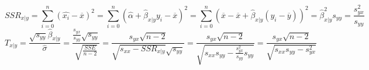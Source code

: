 \[SSR_{x|y} = \sum_{i=0}^n (\hat{x_i} - \overline{x})^2 = \sum_{i=0}^n (\hat{\alpha} + \hat{\beta}_{x|y} y_i - \overline{x} )^2 = \sum_{i=0}^n (\overline{x} - \overline{x} + \hat{\beta}_{x|y}(y_i - \overline{y}) )^2  = \hat{\beta}_{x|y}^2 s_{yy} = \frac{s_{yx}^2}{s_{yy}}\]
\[T_{x|y} = \frac{\sqrt{s_{yy} } \hat{\beta}_{x|y}  }{\hat{\sigma}} = \frac{\frac{s_{yx}}{s_{yy}} \sqrt{s_{yy}} }{\sqrt{\frac{SSE}{n-2}}} = \frac{ s_{yx}\sqrt{n-2}  }{ \sqrt{s_{xx} - SSR_{x|y}}\sqrt{s_{yy}}  } = \frac{ s_{yx}\sqrt{n-2}  }{ \sqrt{ s_{xx}s_{yy} - \frac{s_{yx}^2}{s_{yy}} s_{yy}   }  } =  \frac{ s_{yx}\sqrt{n-2}  }{ \sqrt{ s_{xx}s_{yy} - {s_{yx}^2}   }  }\]